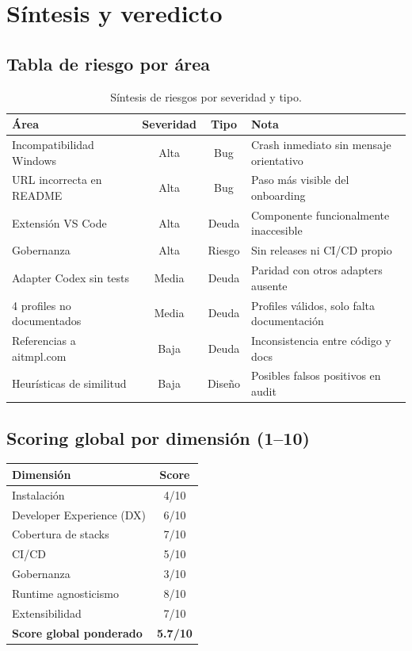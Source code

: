 \documentclass[11pt,a4paper]{article}
\begin{document}
\section{Síntesis y veredicto}

\subsection{Tabla de riesgo por área}

\begin{table}[h!]
\centering
\small
\begin{tabular}{p{4cm}ccp{5cm}}
\toprule
\textbf{Área} & \textbf{Severidad} & \textbf{Tipo} & \textbf{Nota} \\
\midrule
Incompatibilidad Windows & Alta & Bug & Crash inmediato sin mensaje orientativo \\
URL incorrecta en README & Alta & Bug & Paso más visible del onboarding \\
Extensión VS Code & Alta & Deuda & Componente funcionalmente inaccesible \\
Gobernanza & Alta & Riesgo & Sin releases ni CI/CD propio \\
Adapter Codex sin tests & Media & Deuda & Paridad con otros adapters ausente \\
4 profiles no documentados & Media & Deuda & Profiles válidos, solo falta documentación \\
Referencias a aitmpl.com & Baja & Deuda & Inconsistencia entre código y docs \\
Heurísticas de similitud & Baja & Diseño & Posibles falsos positivos en audit \\
\bottomrule
\end{tabular}
\caption{Síntesis de riesgos por severidad y tipo.}
\end{table}

\subsection{Scoring global por dimensión (1--10)}

\begin{center}
\begin{tabular}{lc}
\toprule
\textbf{Dimensión} & \textbf{Score} \\
\midrule
Instalación & 4/10 \\
Developer Experience (DX) & 6/10 \\
Cobertura de stacks & 7/10 \\
CI/CD & 5/10 \\
Gobernanza & 3/10 \\
Runtime agnosticismo & 8/10 \\
Extensibilidad & 7/10 \\
\midrule
\textbf{Score global ponderado} & \textbf{5.7/10} \\
\bottomrule
\end{tabular}
\end{center}
\end{document}
